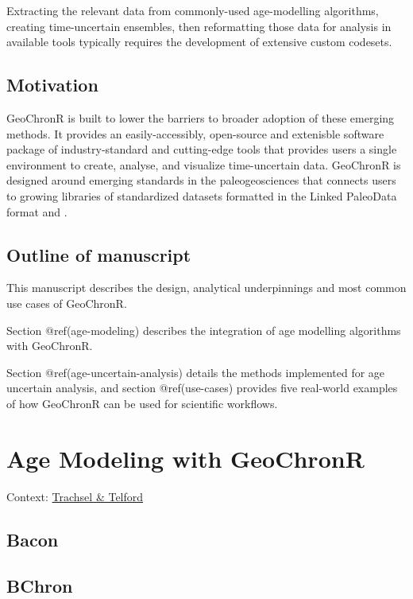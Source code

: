 \documentclass[gc, manuscript]{copernicus}
\begin{document}
Extracting the relevant data from commonly-used age-modelling
algorithms, creating time-uncertain ensembles, then reformatting those
data for analysis in available tools typically requires the development
of extensive custom codesets.

\subsection{Motivation}

GeoChronR is built to lower the barriers to broader adoption of these
emerging methods. It provides an easily-accessibly, open-source and
extenisble software package of industry-standard and cutting-edge tools
that provides users a single environment to create, analyse, and
visualize time-uncertain data. GeoChronR is designed around emerging
standards in the paleogeosciences that connects users to growing
libraries of standardized datasets formatted in the Linked PaleoData
format \citep{LiPD} and \citep{neotoma}.

\subsection{Outline of manuscript}

This manuscript describes the design, analytical underpinnings and most
common use cases of GeoChronR.

Section @ref(age-modeling) describes the integration of age modelling
algorithms with GeoChronR.

Section @ref(age-uncertain-analysis) details the methods implemented for
age uncertain analysis, and section @ref(use-cases) provides five
real-world examples of how GeoChronR can be used for scientific
workflows.

\hypertarget{age-modeling}{%
\section{Age Modeling with GeoChronR}\label{age-modeling}}

Context: \href{https://doi.org/10.1177/0959683616675939}{Trachsel \&
Telford}

\subsection{Bacon}

\subsection{BChron}
\end{document}
